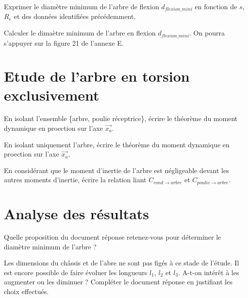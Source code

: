\documentclass[11pt]{article}
\begin{document}
\UPSTIquestion Exprimer le diamètre minimum de l'arbre de flexion $d_{flexion\_mini}$ en fonction de $s$, $R_e$ et des données identifiées précédemment. 
\begin{UPSTIcorrige}
\end{UPSTIcorrige}

\UPSTIquestion Calculer le dimaètre minimum de l'arbre en flexion $d_{flexion\_mini}$. On pourra s'appuyer sur la figure 21 de l'annexe E. 
\begin{UPSTIcorrige}
\end{UPSTIcorrige}


\section{Etude de l'arbre en torsion exclusivement}
\UPSTIquestion* En isolant l'ensemble \{arbre, poulie réceptrice\}, écrire le théorème du moment dynamique en proection sur l'axe $\overrightarrow{x_a}$.
\begin{UPSTIcorrige}
\end{UPSTIcorrige}

\UPSTIquestion En isolant uniquement l'arbre, écrire le théorème du moment dynamique en proection sur l'axe $\overrightarrow{x_a}$.
\begin{UPSTIcorrige}
\end{UPSTIcorrige}

\UPSTIquestion En considérant que le moment d'inertie de l'arbre est négligeable devant les autres moments d'inertie, écrire la relation liant $C_{rond\rightarrow arbre}$ et $C_{poulie\rightarrow arbre}$.
\begin{UPSTIcorrige}
\end{UPSTIcorrige}

\section{Analyse des résultats}

\UPSTIquestion* Quelle proposition du document réponse retenez-vous pour déterminer le diamètre minimum de l'arbre ?
\begin{UPSTIcorrige}
\end{UPSTIcorrige}

\UPSTIquestion Les dimensions du châssis et de l'abre ne sont pas figés à ce stade de l'étude. Il est encore possible de faire évoluer les longueurs $l_1$, $l_2$ et $l_3$. A-t-on intérêt à les augmenter ou les diminuer ? Compléter le document réponse en justifiant les choix effectués. 
\begin{UPSTIcorrige}
\end{UPSTIcorrige}
\end{document}
